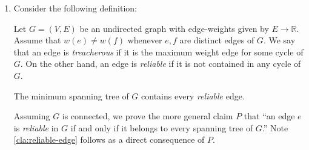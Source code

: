 \documentclass[10pt, letterpaper]{article}
\begin{document}
\begin{enumerate}[label={\bfseries Q\arabic*.}]
    \vspace*{\baselineskip}
    {\itshape Time Analysis} \par
    Let $V$ represent the different sites on the map and $E$ the routes between them. Then
    we can construct $G$ in $O(V+E)$ time. A call to Dijkstra on $G$ takes $O((E+V) \log V)$
    and the reconstruction of $p$ takes at most $O(V)$ with backtracking. This yields a total
    running time of $O((E+V) \log V)$.

  \item
    Consider the following definition:
    \begin{definition*}
      Let $G = (V, E)$ be an undirected graph with edge-weights given by $E \rightarrow
      \mathbb{R}$. Assume that $w(e) \neq w(f)$ whenever $e, f$ are distinct edges of $G$.
      We say that an edge is \textit{treacherous} if it is the maximum weight edge for some
      cycle of $G$. On the other hand, an edge is \textit{reliable} if it is not contained
      in any cycle of $G$.
    \end{definition*}

    \begin{claim}
      \label{cla:reliable-edge}
      The minimum spanning tree of $G$ contains every \textit{reliable} edge.
    \end{claim}

    \begin{proof*}
      Assuming $G$ is connected, we prove the more general claim $P$ that ``an edge $e$ is
      \textit{reliable} in $G$ if and only if it belongs to every spanning tree of $G$.''
      Note \autoref{cla:reliable-edge} follows as a direct consequence of $P$. \par
    \end{proof*}


\end{enumerate}
\end{document}
